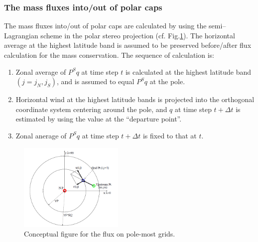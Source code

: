 \subsubsection{The mass fluxes into/out of polar caps}
The mass fluxes into/out of polar caps are calculated by using the semi–Lagrangian scheme in the polar stereo projection (cf. Fig.\ref{f2}).
The horizontal average at the highest latitude band is assumed to be preserved before/after flux calculation for the mass conservation. The sequence of calculation is:
\begin{enumerate}
\item Zonal average of $P^{S}q$ at time step $t$ is calculated at the highest latitude band $(j=j_{N},j_{S})$, and is assumed to equal $P^{S}q$ at the pole.
\item Horizontal wind at the highest latitude bands is projected into the orthogonal coordinate system centering around the pole, and $q$ at time step $t + \Delta t$ is estimated by using the value at the “departure point”.
\item Zonal anerage of $P^{S}q$ at time step $t+\Delta t$ is fixed to that at $t$.
\end{enumerate}

\begin{figure}
  \centering
  \includegraphics[width=5cm]{polar_tracer_advection.png}
  \caption{Conceptual figure for the flux on pole-most grids.}
  \label{f2}
\end{figure}
